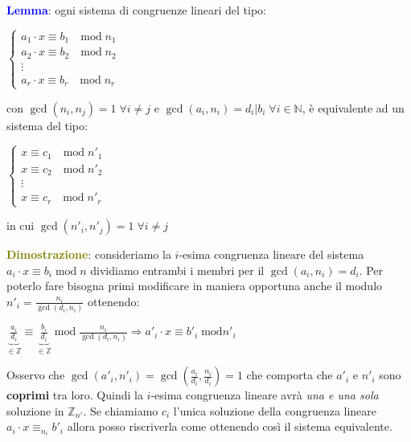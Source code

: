 \begin{flushleft}
    \textcolor{blue}{\textbf{Lemma}}: ogni sistema di congruenze lineari del tipo:

    {\centering
        $\begin{cases}
            a_1 \cdot x \equiv b_1 \quad \text{mod} \; n_1 \\
            a_2 \cdot x \equiv b_2 \quad \text{mod} \; n_2 \\
            \vdots \\
            a_r \cdot x \equiv b_r \quad \text{mod} \; n_r
        \end{cases}$
    \par}
    con $\gcd (n_i, n_j) = 1 \; \forall i \neq j$ e $\gcd (a_i, n_i) = d_i|b_i \; \forall i \in \mathbb{N}$, è equivalente ad un sistema del tipo:

    {\centering
        $\begin{cases}
            x \equiv c_1 \quad \text{mod} \; n'_1 \\
            x \equiv c_2 \quad \text{mod} \; n'_2 \\
            \vdots \\
            x \equiv c_r \quad \text{mod} \; n'_r
        \end{cases}$
    \par}
    in cui $\gcd (n'_i, n'_j) = 1 \; \forall i \neq j$

    \begin{boxA}
        \textcolor{olive}{\textbf{Dimostrazione}}: consideriamo la $i$-esima congruenza lineare del sistema $a_i \cdot x \equiv b_i \; \text{mod} \; n$ dividiamo entrambi i membri per il $\gcd (a_i, n_i) = d_i$. Per poterlo fare bisogna primi modificare in maniera opportuna anche il modulo $n'_i = \frac{n_i}{\gcd (d_i, n_i)}$ ottenendo:

        {\centering
            $\underset{\in \mathbb{Z}}{\underbrace{\frac{a_i}{d_i}}} \equiv \underset{\in \mathbb{Z}}{\underbrace{\frac{b_i}{d_i}}} \; \text{mod} \; \frac{n_i}{\gcd (d_i, n_i)} \Longrightarrow a'_i \cdot x \equiv b'_i \; \text{mod} n'_i$
        \par}
        Osservo che $\gcd (a'_i, n'_i) = \gcd (\frac{a_i}{d_i}, \frac{n_i}{d_i}) = 1$ che comporta che $a'_i$ e $n'_i$ sono \textbf{coprimi} tra loro. Quindi la $i$-esima congruenza lineare avrà \textit{una e una sola} soluzione in $\mathbb{Z}_{n'}$. Se chiamiamo $c_i$ l'unica soluzione della congruenza lineare  $a_i \cdot x \equiv_{n_i} b'_i$ allora posso riscriverla come  ottenendo così il sistema equivalente.
    \end{boxA}
\end{flushleft}

